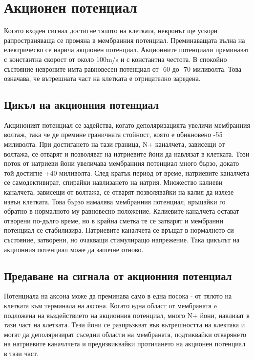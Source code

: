 \documentclass{article}
\begin{document}
\vspace{5mm} %


\section{Акционен потенциал}
Когато входен сигнал достигне тялото на клетката, невронът ще ускори рапространяваща се промяна в мембранния потенциал. Преминаващата вълна на електричесво се нарича акционен потенциал. Акционните потенциали преминават с константна скорост от около 100m/s и с константна честота. 
В спокойно състояние невроните имта равновесен потенциал от -60 до -70 миливолта. Това означава, че вътрешната част на клетката е отрицателно заредена.

\subsection{Цикъл на акционния потенциал}

Акциноният потенциал се задейства, когато деполяризацията увеличи мембранния волтаж, така че де премине граничната стойност, която е обикновено -55 миливолта. При достигането на тази граница, N+ каналчета, зависещи от волтажа, се отварят и позволяват на натриевите йони да навлязат в клетката. Този поток от натриеви йони увеличава мембранния потенциал много бързо, докато той достигне +40 миливолта. След кратък период от време, натриевите каналчета се самодективират, спирайки навлизането на натрия. Множество калиеви каналчета, зависещи от волтажа, се отварят позволявайки на калия да излезе извън клетката. Това бързо намалява мембранния потенциал, връщайки го обратно в нормалното му равновесно положение. Калиевите каналчета остават отворени по-дълго време, но в крайна сметка те се затварят и мембранни потенциал се стабилизира. Натриевите каналчета се връщат в нормалното си състояние, затворени, но очакващи стимулиращо напрежение. Така цикълът на акционния потенциал може да започне отново.

\subsection{Предаване на сигнала от акционния потенциал}

Потенциала на аксона може да преминава само в една посока - от тялото на клетката към терминала на аксона. Когато една област от мембраната e подложена на въздействието на акционния потенциал, много N+ йони, навлизат в тази част на клетката. Тези йони се разпръзкват във вътрешността на клектака и могат да деполяризират съседни области на мембраната, подтиквайки отварянето на натриевите каначлчета и предизвиквайки протичането на акционен потенциал в тази част.
\end{document}
